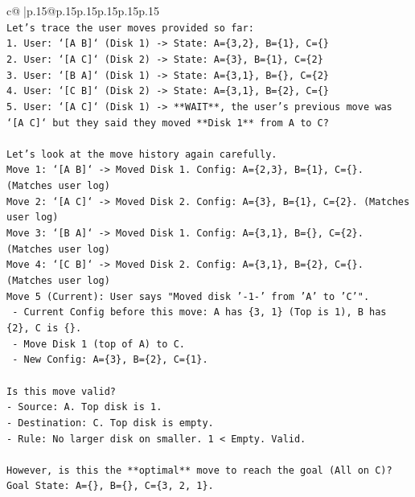 \documentclass{article}
\begin{document}
{\begin{supertabular}{c@{$\;$}|p{.15\linewidth}@{}p{.15\linewidth}p{.15\linewidth}p{.15\linewidth}p{.15\linewidth}p{.15\linewidth}}
{{{\\ 
\texttt{Let's trace the user moves provided so far:} \\
\texttt{1. User: `{[}A B{]}` (Disk 1) {-}> State: A=\{3,2\}, B=\{1\}, C=\{\}} \\
\texttt{2. User: `{[}A C{]}` (Disk 2) {-}> State: A=\{3\}, B=\{1\}, C=\{2\}} \\
\texttt{3. User: `{[}B A{]}` (Disk 1) {-}> State: A=\{3,1\}, B=\{\}, C=\{2\}} \\
\texttt{4. User: `{[}C B{]}` (Disk 2) {-}> State: A=\{3,1\}, B=\{2\}, C=\{\}} \\
\texttt{5. User: `{[}A C{]}` (Disk 1) {-}> **WAIT**, the user's previous move was `{[}A C{]}` but they said they moved **Disk 1** from A to C?} \\
\\ 
\texttt{Let's look at the move history again carefully.} \\
\texttt{Move 1: `{[}A B{]}` {-}> Moved Disk 1. Config: A=\{2,3\}, B=\{1\}, C=\{\}. (Matches user log)} \\
\texttt{Move 2: `{[}A C{]}` {-}> Moved Disk 2. Config: A=\{3\}, B=\{1\}, C=\{2\}. (Matches user log)} \\
\texttt{Move 3: `{[}B A{]}` {-}> Moved Disk 1. Config: A=\{3,1\}, B=\{\}, C=\{2\}. (Matches user log)} \\
\texttt{Move 4: `{[}C B{]}` {-}> Moved Disk 2. Config: A=\{3,1\}, B=\{2\}, C=\{\}. (Matches user log)} \\
\texttt{Move 5 (Current): User says "Moved disk '{-}1{-}' from 'A' to 'C'".} \\
\texttt{   {-} Current Config before this move: A has \{3, 1\} (Top is 1), B has \{2\}, C is \{\}.} \\
\texttt{   {-} Move Disk 1 (top of A) to C.} \\
\texttt{   {-} New Config: A=\{3\}, B=\{2\}, C=\{1\}.} \\
\\ 
\texttt{Is this move valid?} \\
\texttt{{-} Source: A. Top disk is 1.} \\
\texttt{{-} Destination: C. Top disk is empty.} \\
\texttt{{-} Rule: No larger disk on smaller. 1 < Empty. Valid.} \\
\\ 
\texttt{However, is this the **optimal** move to reach the goal (All on C)?} \\
\texttt{Goal State: A=\{\}, B=\{\}, C=\{3, 2, 1\}.} \\
}}}
\end{supertabular}}
\end{document}
